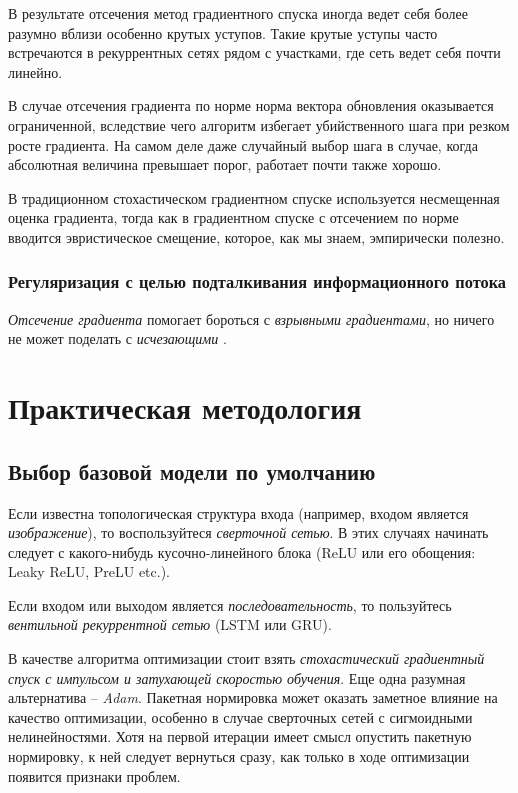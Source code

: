 \documentclass[%
	11pt,
	a4paper,
	utf8,
]{article}
\begin{document}
В результате отсечения метод градиентного спуска иногда ведет себя более разумно вблизи особенно крутых уступов. Такие крутые уступы часто встречаются в рекуррентных сетях рядом с участками, где сеть ведет себя почти линейно. 

В случае отсечения градиента по норме норма вектора обновления оказывается ограниченной, вследствие чего алгоритм избегает убийственного шага при резком росте градиента. На самом деле даже случайный выбор шага в случае, когда абсолютная величина превышает порог, работает почти также хорошо.

В традиционном стохастическом градиентном спуске используется несмещенная оценка градиента, тогда как в градиентном спуске с отсечением по норме вводится эвристическое смещение, которое, как мы знаем, эмпирически полезно.

\subsubsection{Регуляризация с целью подталкивания информационного потока}

\emph{Отсечение градиента} помогает бороться с \emph{взрывными градиентами}, но ничего не может поделать с \emph{исчезающими} \cite[]{goodfellow:ml-2018}.

\section{Практическая методология}

\subsection{Выбор базовой модели по умолчанию}

Если известна топологическая структура входа (например, входом является \emph{изображение}), то воспользуйтеся \emph{сверточной сетью}. В этих случаях начинать следует с какого-нибудь кусочно-линейного блока (ReLU или его обощения: Leaky ReLU, PreLU etc.).

Если входом или выходом является \emph{последовательность}, то пользуйтесь \emph{вентильной рекуррентной сетью} (LSTM или GRU).

В качестве алгоритма оптимизации стоит взять \emph{стохастический градиентный спуск с импульсом и затухающей скоростью обучения}. Еще одна разумная альтернатива -- \emph{Adam}. Пакетная нормировка может оказать заметное влияние на качество оптимизации, особенно в случае сверточных сетей с сигмоидными нелинейностями. Хотя на первой итерации имеет смысл опустить пакетную нормировку, к ней следует вернуться сразу, как только в ходе оптимизации появится признаки проблем.
\end{document}
